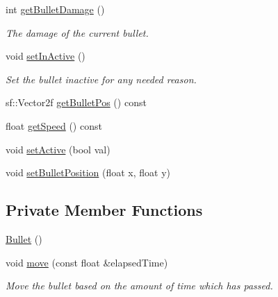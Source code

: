 \begin{DoxyCompactItemize}
int \hyperlink{class_bullet_a588467f138b5c65d018bf04ab2ca2931}{get\+Bullet\+Damage} ()
\begin{DoxyCompactList}\small\item\em The damage of the current bullet. \end{DoxyCompactList}\item 
void \hyperlink{class_bullet_afe143dafb173b03b6f35fa9472cbe465}{set\+In\+Active} ()
\begin{DoxyCompactList}\small\item\em Set the bullet inactive for any needed reason. \end{DoxyCompactList}\item 
sf\+::\+Vector2f \hyperlink{class_bullet_a22bc1ccf27f5ff8fe939616ca10b1489}{get\+Bullet\+Pos} () const
\item 
float \hyperlink{class_bullet_ac1d1af57b11dae435ca8d951e85b7079}{get\+Speed} () const
\item 
void \hyperlink{class_bullet_adfd1d1a317bd18f9d6aec65630301ae2}{set\+Active} (bool val)
\item 
void \hyperlink{class_bullet_af6e316869e595d8f0b2af44dd80a8dd6}{set\+Bullet\+Position} (float x, float y)
\end{DoxyCompactItemize}
\subsection*{Private Member Functions}
\begin{DoxyCompactItemize}
\item 
\hyperlink{class_bullet_acd7befc0bc18907cc1d871d37bbdddeb}{Bullet} ()
\item 
void \hyperlink{class_bullet_a1ea29046b26f40abb9f94ca2ccd5d215}{move} (const float \&elapsed\+Time)
\begin{DoxyCompactList}\small\item\em Move the bullet based on the amount of time which has passed. \end{DoxyCompactList}\end{DoxyCompactItemize}
